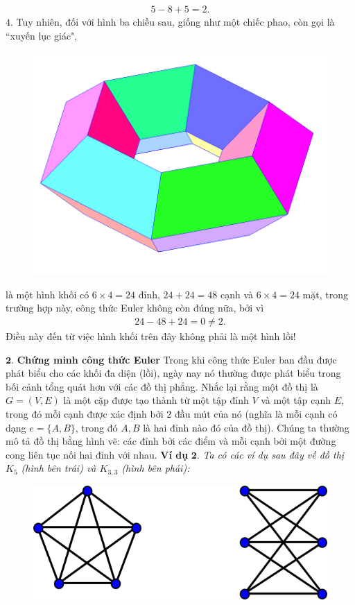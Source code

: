 \begin{multicols}{2}
{	\begin{align*}
		\boxed{5-8+5=2.}
	\end{align*}
	$4.$ Tuy nhiên, đối với hình ba chiều sau, giống như một chiếc phao, còn gọi là ``xuyến lục giác",
	\begin{figure}[H]
		\centering
		\vspace*{-5pt}
		\captionsetup{labelformat= empty, justification=centering}
		\includegraphics[width=0.5\linewidth]{Hexagonal_torus}
		\vspace*{-10pt}
	\end{figure}
	là một hình khối có $6\times 4=24$ đỉnh, $24+ 24=48$ cạnh và $6\times 4=24$ mặt, trong trường hợp này, công thức Euler không còn đúng nữa, bởi vì
	\begin{align*}
		\boxed{ 24 - 48 + 24 = 0\neq  2}.
	\end{align*}
	Điều này đến từ việc hình khối trên đây không phải là một hình lồi!}
	\vskip 0.1cm
	$\pmb{2.}$ \textbf{\color{hoccungpi}Chứng minh công thức Euler}
	\vskip 0.1cm
	Trong khi công thức Euler ban đầu được phát biểu cho các khối đa diện (lồi),  ngày nay nó thường được phát biểu trong bối cảnh tổng quát hơn với các đồ thị phẳng.
	\vskip 0.1cm
	Nhắc lại rằng một đồ thị là $G=(V, E)$ là một cặp được tạo thành từ một tập đỉnh $V$ và một tập cạnh $E$, trong đó mỗi cạnh được xác định bởi $2$ đầu mút của nó (nghĩa là mỗi cạnh có dạng $e=\{A,B\}$, trong đó  $A, B$ là hai đỉnh nào đó của đồ thị). Chúng ta thường mô tả đồ thị bằng hình vẽ: các đỉnh bởi các điểm và mỗi cạnh bởi một đường cong liên tục nối hai đỉnh với nhau. 
	\vskip 0.1cm
	\textbf{\color{hoccungpi}Ví dụ} $\pmb{2.}$
	\textit{Ta có các ví dụ sau đây về đồ thị $K_5$ (hình bên trái) và $K_{3,3}$ (hình bên phải):}
	\begin{figure}[H]
		\centering
		\vspace*{-5pt}
		\captionsetup{labelformat= empty, justification=centering}
		\includegraphics[width=1\linewidth]{k5_n_k33}

\end{figure}
\end{multicols}
